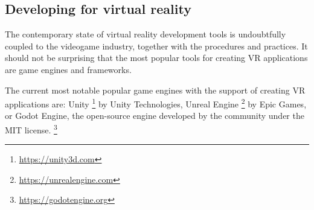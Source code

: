 \hypertarget{x-developing-for-virtual-reality}{\subsection*{Developing for virtual reality}}
The contemporary state of virtual reality development tools is undoubtfully
coupled to the videogame industry, together with the procedures and practices.
It should not be surprising that the most popular tools for creating
VR applications are game engines and frameworks.


The current most notable popular game engines with the support of creating VR
applications are: Unity \footnote{\href{https://unity3d.com}{https://unity3d.com}} by
Unity Technologies, Unreal Engine \footnote{\href{https://unrealengine.com}{https://unrealengine.com}} by
Epic Games, or Godot Engine, the open-source engine developed by the community
under the MIT license. \footnote{\href{https://godotengine.org}{https://godotengine.org}} \hyperlink{slantvr}{}

